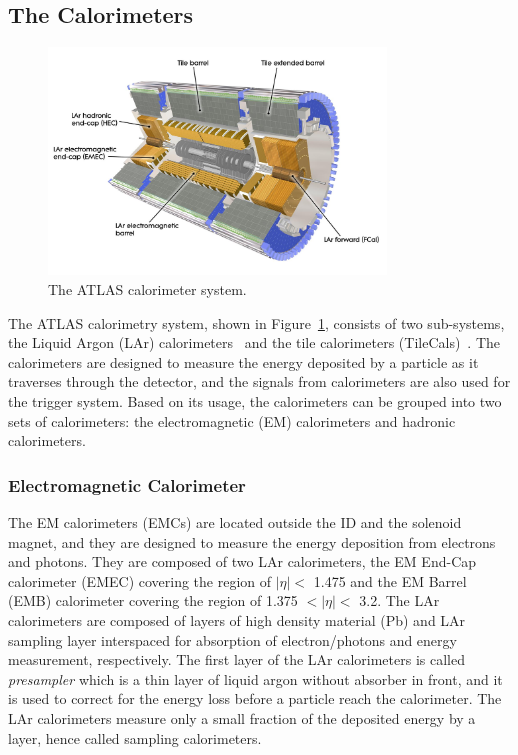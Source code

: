\subsection{The Calorimeters}
\label{sec:atlas:calorimeter}

\begin{figure}[!htb]
    \includegraphics[width=0.8\textwidth]{figures/calorimeter.jpg}
    \centering
    \caption{The ATLAS calorimeter system.}
    \label{fig:calorimeter}
\end{figure}


The ATLAS calorimetry system, shown in Figure~\ref{fig:calorimeter}, consists of two sub-systems, the Liquid Argon (LAr) calorimeters~\cite{1742-6596-293-1-012044} and the tile calorimeters (TileCals)~\cite{HenriquesCorreia:2004868}. The calorimeters are designed to measure the energy deposited by a particle as it traverses through the detector, and the signals from calorimeters are also used for the trigger system. Based on its usage, the calorimeters can be grouped into two sets of calorimeters: the electromagnetic (EM) calorimeters and hadronic calorimeters.


\subsubsection{Electromagnetic Calorimeter}
\label{sec:atlas:EMcal}
The EM calorimeters (EMCs) are located outside the ID and the solenoid magnet, and they are designed to measure the energy deposition from electrons and photons. They are composed of two LAr calorimeters, the EM End-Cap calorimeter (EMEC) covering the region of $|\eta|<$ 1.475 and the EM Barrel (EMB) calorimeter covering the region of 1.375 $<|\eta|<$ 3.2. The LAr calorimeters are composed of layers of high density material (Pb) and LAr sampling layer interspaced for absorption of electron/photons and energy measurement, respectively. The first layer of the LAr calorimeters is called \textit{presampler} which is a thin layer of liquid argon without absorber in front, and it is used to correct for the energy loss before a particle reach the calorimeter. The LAr calorimeters measure only a small fraction of the deposited energy by a layer, hence called sampling calorimeters.

